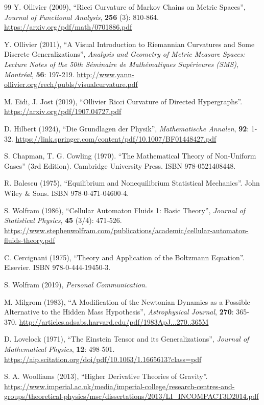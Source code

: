 \documentclass{article}
\begin{document}
\begin{thebibliography}{99}
Y. Ollivier (2009), ``Ricci Curvature of Markov Chains on Metric Spaces'', \textit{Journal of Functional Analysis}, \textbf{256} (3): 810-864. \url{https://arxiv.org/pdf/math/0701886.pdf}

Y. Ollivier (2011), ``A Visual Introduction to Riemannian Curvatures and Some Discrete Generalizations'', \textit{Analysis and Geometry of Metric Measure Spaces: Lecture Notes of the 50th S\'eminaire de Math\'ematiques Sup\'erieures (SMS), Montr\'eal}, \textbf{56}: 197-219. \url{http://www.yann-ollivier.org/rech/publs/visualcurvature.pdf}

M. Eidi, J. Jost (2019), ``Ollivier Ricci Curvature of Directed Hypergraphs''. \url{https://arxiv.org/pdf/1907.04727.pdf}

D. Hilbert (1924), ``Die Grundlagen der Physik'', \textit{Mathematische Annalen}, \textbf{92}: 1-32. \url{https://link.springer.com/content/pdf/10.1007/BF01448427.pdf}

S. Chapman, T. G. Cowling (1970). ``The Mathematical Theory of Non-Uniform Gases'' (3rd Edition). Cambridge University Press. ISBN 978-0521408448.

R. Balescu (1975), ``Equilibrium and Nonequilibrium Statistical Mechanics''. John Wiley \& Sons. ISBN 978-0-471-04600-4.

S. Wolfram (1986), ``Cellular Automaton Fluids 1: Basic Theory'', \textit{Journal of Statistical Physics}, \textbf{45} (3/4): 471-526. \url{https://www.stephenwolfram.com/publications/academic/cellular-automaton-fluids-theory.pdf}

C. Cercignani (1975), ``Theory and Application of the Boltzmann Equation''. Elsevier. ISBN 978-0-444-19450-3.

S. Wolfram (2019), \textit{Personal Communication}.

M. Milgrom (1983), ``A Modification of the Newtonian Dynamics as a Possible Alternative to the Hidden Mass Hypothesis'', \textit{Astrophysical Journal}, \textbf{270}: 365-370. \url{http://articles.adsabs.harvard.edu/pdf/1983ApJ...270..365M}

D. Lovelock (1971), ``The Einstein Tensor and its Generalizations'', \textit{Journal of Mathematical Physics}, \textbf{12}: 498-501. \url{https://aip.scitation.org/doi/pdf/10.1063/1.1665613?class=pdf}

S. A. Woolliams (2013), ``Higher Derivative Theories of Gravity''. \url{https://www.imperial.ac.uk/media/imperial-college/research-centres-and-groups/theoretical-physics/msc/dissertations/2013/LI_INCOMPACT3D2014.pdf}


\end{thebibliography}
\end{document}
